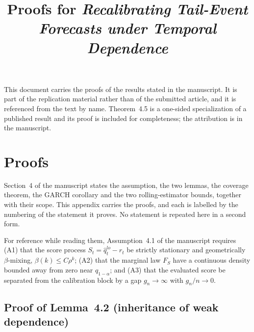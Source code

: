 \documentclass[preprint,11pt,authoryear]{elsarticle}
\newcommand{\1}{\boldsymbol{1}}
\begin{document}
\title{Proofs for \emph{Recalibrating Tail-Event Forecasts under Temporal Dependence}}
\date{}
\maketitle

\noindent This document carries the proofs of the results stated in the
manuscript. It is part of the replication material rather than of the
submitted article, and it is referenced from the text by name.
Theorem~4.5 is a one-sided specialization of a published result and its
proof is included for completeness; the attribution is in the manuscript.

\section{Proofs}
\label{app:proofs}

Section~4 of the manuscript states the assumption, the two lemmas, the coverage
theorem, the GARCH corollary and the two rolling-estimator bounds, together with
their scope. This appendix carries the proofs, and each is labelled by the
numbering of the statement it proves. No statement is repeated here in a second
form.

For reference while reading them, Assumption~4.1 of the manuscript requires
(A1) that the score process $S_t = \hat q_t^{lo} - r_t$ be strictly stationary
and geometrically $\beta$-mixing, $\beta(k)\le C\rho^k$; (A2) that the marginal
law $F_S$ have a continuous density bounded away from zero near
$q_{1-\alpha}$; and (A3) that the evaluated score be separated from the
calibration block by a gap $g_n\to\infty$ with $g_n/n\to0$.

\subsection{Proof of Lemma~4.2 (inheritance of weak dependence)}
\label{app:lem_score_mixing}
\end{document}
